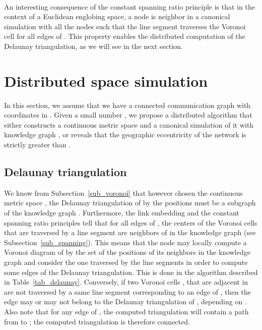 \documentclass{article}
\begin{document}
\paragraph{}

An interesting consequence of the constant spanning ratio principle is that in the context of a Euclidean englobing space, a node  is neighbor in a canonical simulation with all the nodes  such that the line segment  traverses the Voronoi cell  for all edges  of . This property enables the distributed computation of the Delaunay triangulation, as we will see in the next section.

\section{Distributed space simulation}
\label{sec_distributed}

In this section, we assume that we have a connected communication graph with coordinates in . Given a small number , we propose a distributed algorithm that either constructs a continuous metric space  and a canonical simulation of it with knowledge graph , or reveals that the geographic eccentricity of the network is strictly greater than .

\subsection{Delaunay triangulation}
\label{sub_dist_delaunay}

We know from Subsection~\ref{sub_voronoi} that however chosen the continuous metric space , the Delaunay triangulation of  by the positions  must be a subgraph of the knowledge graph . Furthermore, the link embedding and the constant spanning ratio principles tell that for all edges  of , the centers of the Voronoi cells that are traversed by a line segment  are neighbors of  in the knowledge graph  (see Subsection~\ref{sub_spanning}). This means that the node  may locally compute a Voronoi diagram of  by the set of the positions of its neighbors in the knowledge graph  and consider the one traversed by the line segments  in order to compute some edges of the Delaunay triangulation. This is done in the algorithm described in Table~\ref{tab_delaunay}. Conversely, if two Voronoi cells ,  that are adjacent in  are not traversed by a same line segment corresponding to an edge of , then the edge  may or may not belong to the Delaunay triangulation of , depending on . Also note that for any edge  of , the computed triangulation will contain a path from  to ; the computed triangulation is therefore connected.
\end{document}

